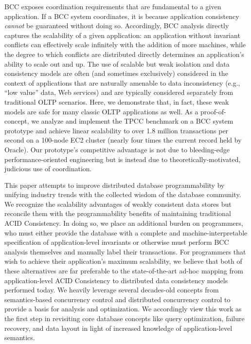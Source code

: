 BCC exposes coordination requirements that are fundamental to a given
application. If a BCC system coordinates, it is because application
consistency \textit{cannot} be guaranteed without doing
so. Accordingly, BCC analysis directly captures the scalability of a
given application: an application without invariant conflicts can
effectively scale infinitely with the addition of more machines, while
the degree to which conflicts are distributed directly determines an
application's ability to scale out and up. The use of scalable but
weak isolation and data consistency models are often (and sometimes
exclusively) considered in the context of applications that are
naturally amenable to data inconsistency (e.g., ``low value'' data,
Web services) and are typically considered separately from traditional
OLTP scenarios. Here, we demonstrate that, in fact, these weak models
are safe for many classic OLTP applications as well. As a
proof-of-concept, we analyze and implement the TPCC benchmark on a BCC
system prototype and achieve linear scalability to over 1.8 million
transactions per second on a 100-node EC2 cluster (nearly four times
the current record held by Oracle). Our prototype's competitive
advantage is not due to bleeding-edge performance-oriented engineering
but is instead due to theoretically-motivated, judicious use of
coordination.

This paper attempts to improve distributed database programmability by
unifying industry trends with the collected wisdom of the database
community. We recognize the scalability advantages of weakly
consistent data stores but reconcile them with the programmability
benefits of maintaining traditional ACID Consistency. In doing so, we
place an additional burden on programmers, who must either provide the
database with a complete and machine-interpretable specification of
application-level invariants or otherwise must perform BCC analysis
themselves and manually label their transactions. For programmers that
wish to achieve their application's maximum scalability, we believe
that both of these alternatives are far preferable to the
state-of-the-art ad-hoc mapping from application-level ACID
Consistency to distributed data consistency models performed today. We
heavily leverage several decades-old concepts from semantics-based
concurrency control and distributed concurrency control to provide a
basis for analysis and optimization. We accordingly view this work as
the first step in revisiting core database concepts like query
optimization, failure recovery, and data layout in light of increased
knowledge of application-level semantics.

~\cite{megastore}

